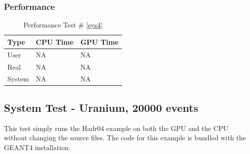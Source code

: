 \documentclass[12pt]{article}
\begin{document}
	\subsubsection{Performance}
		\begin{table}[!htbp]
		\centering
		\caption{Performance Test \# \ref{sys4}}\label{_acc}
		\begin{tabular}{lll}
		\toprule
		Type&CPU Time& GPU Time\\\midrule
		User&NA&NA\\
		Real&NA&NA\\
		System&NA&NA\\
		\end{tabular}
		\end{table}
		
\subsection{System Test - Uranium, 20000 events}
This test simply runs the Hadr04 example on both the GPU and the CPU without changing the source files. The code for this example is bundled with the GEANT4 installation.\\
\break
\end{document}
